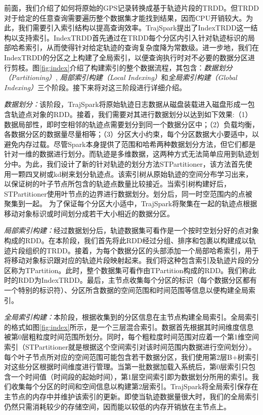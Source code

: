 	前面，我们介绍了如何将原始的GPS记录转换成基于轨迹片段的TRDD。但TRDD对于给定的任意查询需要遍历整个数据集才能找到结果，因而CPU开销较大。为此，我们需要引入索引结构以提高查询效率。TrajSpark提出了IndexTRDD这一结构以支持索引。IndexTRDD首先通过在TRDD每个分区内引入针对轨迹标识的局部哈希索引，从而使得针对给定轨迹的查询复杂度降为常数级。进一步地，我们在IndexTRDD的分区之上构建了全局索引，以便查询执行时对不必要的数据分区进行剪枝。图\ref{fig:index}介绍了构建索引的整个数据流程，其包含：\emph{数据划分（Partitioning）}, \emph{局部索引构建（Local Indexing）}和\emph{全局索引构建（Global Indexing）}三个阶段。接下来将对这三阶段进行详细介绍。
	
	\emph{数据划分：}该阶段，TrajSpark将原始轨迹日志数据从磁盘装载进入磁盘形成一包含轨迹点对象的RDD。接着，我们需要对其进行数据划分以达到如下效果:（1）\textsf{数据局部性}，即时空相邻的轨迹点需要划分到同一个数据分区中；（2）\textsf{负载均衡}，各数据分区的数据量尽量相等；（3）\textsf{分区大小约束}，每个分区数据大小要适中，以避免内存过载。尽管Spark本身提供了范围和哈希两种数据划分方法，但它们都是针对一维的数据进行划分。而轨迹是多维数据，这两种方式无法简单应用到轨迹划分中。为此，我们设计了新的针对轨迹的划分方法STPartitioner，该方法首先使用一颗四叉树或kd树来划分轨迹点。该索引树从原始轨迹的空间分布学习出来，以保证树的叶子节点所包含的轨迹点数量比较接近。当索引树构建好后，STPartitioner使用叶节点的边界进行数据划分。划分后，同一时空范围内的点被聚集到一起。
	为了保证每个分区大小适中，TrajSpark将聚集在一起的轨迹点根据移动对象标识或时间划分成若干大小相近的数据分区。
	
	\emph{局部索引构建：}经过数据划分后，轨迹数据集可看作是一个按时空划分好的点对象构成的RDD。在本阶段，我们首先将此RDD经过分组、排序和包裹以构建成以轨迹片段组织的TRDD。接着，为每个数据分区的头部添加一个局部哈希索引，用于将移动对象标识跟对应的轨迹片段映射起来。我们将这种包含索引及轨迹片段的分区称为TPartition。此时，整个数据集可看作由TPartition构成的RDD。我们称此时的RDD为IndexTRDD。最后，主节点收集每个分区的标识（每个数据分区都有一个特别的标识符）、分区所含数据的空间范围和时间范围等信息以便构建全局索引。
	
	\emph{全局索引构建：}本阶段，根据收集到的分区信息在主节点构建全局索引。全局索引的格式如图\ref{fig:index}所示，是一个三层混合索引。数据首先根据其时间维度信息被第0层粗粒度时间范围所划分。同时，每个粗粒度时间范围对应着一个第1维空间索引（STPartitioner就是根据这个空间索引对该时间范围内数据进行空间划分）。每个叶子节点所对应的空间范围可能包含若干数据分区，我们使用第2层B+树索引对这些分区根据时间维度进行管理。当第一批数据加载入系统后，第0层索引只包含一个时间值（时间段的起始时间），第1层空间索引即为数据划分所用的索引。我们收集每个分区的时间和空间信息以构建第2层索引。TrajSpark将全局索引保存在主节点的内存中并维护该索引的更新。即使当轨迹数据量很大时，我们的全局索引仍然只需消耗较少的存储空间，因而能以较低的内存开销放在主节点上。

